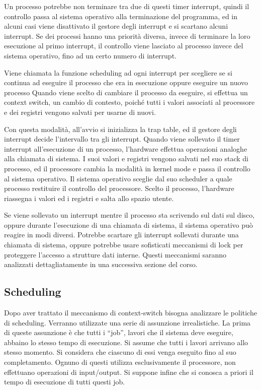 \documentclass{article}
\numberwithin{equation}{subsection}
\begin{document}
Un processo potrebbe non terminare tra due di questi timer interrupt, quindi il controllo passa al sistema operativo alla terminazione del programma, ed in alcuni casi 
viene disattivato il gestore degli interrupt e si scartano alcuni interrupt. Se dei processi hanno una priorità diversa, invece di terminare la loro esecuzione al primo 
interrupt, il controllo viene lasciato al processo invece del sistema operativo, fino ad un certo numero di interrupt. 

Viene chiamata la funzione scheduling ad ogni interrupt per scegliere se si continua ad eseguire il processo che era in esecuzione oppure eseguire un nuovo processo
Quando viene scelto di cambiare il processo da eseguire, si effettua un context switch, un cambio di contesto, poiché tutti i valori associati al processore e dei registri 
vengono salvati per usarne di nuovi. 



Con questa modalità, all'avvio si inizializza la trap table, ed il gestore degli interrupt decide l'intervallo tra gli interrupt. Quando viene sollevato il timer 
interrupt all'esecuzione di un processo, l'hardware effettua operazioni analoghe alla chiamata di sistema. I suoi valori e registri vengono salvati nel suo stack di 
processo, ed il processore cambia la modalità in kernel mode e passa il controllo al sistema operativo. Il sistema operativo sceglie dal suo scheduler a quale processo 
restituire il controllo del processore. Scelto il processo, l'hardware riassegna i valori ed i registri e salta allo spazio utente. 

Se viene sollevato un interrupt mentre il processo sta scrivendo sul dati sul disco, oppure durante l'esecuzione di una chiamata di sistema, il sistema operativo può reagire in modi 
diversi. Potrebbe scartare gli interrupt sollevati durante una chiamata di sistema, oppure potrebbe usare sofisticati meccanismi di lock per proteggere l'accesso a 
strutture dati interne. Questi meccanismi saranno analizzati dettagliatamente in una successiva sezione del corso. 

\subsection{Scheduling}

Dopo aver trattato il meccanismo di context-switch bisogna analizzare le politiche di scheduling. 
Verranno utilizzate una serie di assunzione irrealistiche. 
La prima di queste assunzione è che tutti i ``job'', lavori che il sistema deve eseguire, abbaino lo stesso tempo di esecuzione. Si assume che tutti i lavori arrivano 
allo stesso momento. Si considera che ciascuno di essi venga eseguito fino al suo completamento. Ognuno di questi utilizza esclusivamente il processore, non effettuano 
operazioni di input/output. Si suppone infine che si conosca a priori il tempo di esecuzione di tutti questi job. 
\end{document}
